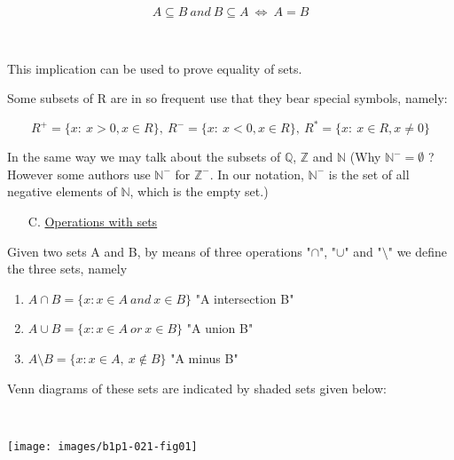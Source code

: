 \documentclass[11pt]{amsbook}
\begin{document}

$$A\subseteq B \ and \ B\subseteq A  \ \Longleftrightarrow \ A=B$$

\par \ \par This implication can be used to prove equality of sets.

Some subsets of R are in so frequent use that they bear special symbols, namely:

$$R^+=\{x: \ x>0,x\in R \}, \ R^-=\{x: \ x<0,x\in R \}, \ R^*=\{x: \ x\in R,x\neq 0 \}$$

In the same way we may talk about the subsets of $\mathbb{Q}$, $\mathbb{Z}$ and $\mathbb{N}$ (Why $\mathbb{N}^-=\emptyset$ ? However some authors use $\mathbb{N}^-$ for $\mathbb{Z}^-$. In our notation, $\mathbb{N}^-$ is the set of all negative elements of $\mathbb{N}$, which is the empty set.)

\begin{enumerate}
  \item[C.] \underline{Operations with sets}
\end{enumerate}

Given two sets A and B, by means of three operations "$\cap$", "$\cup$" and "$\setminus$" we define the three sets, namely

\begin{enumerate}
  \item $A\cap B=\{ x: x\in A \ and \ x\in B\}$  "A intersection B"
  \item $A\cup B=\{ x: x\in A \ or \ x\in B\}$  "A union B"
  \item $A\setminus B=\{ x: x\in A,\ x\not \in B\}$  "A minus B"
\end{enumerate}

Venn diagrams of these sets are indicated by shaded sets given below:

\par \ 

\texttt{[image: images/b1p1-021-fig01]}
\end{document}
